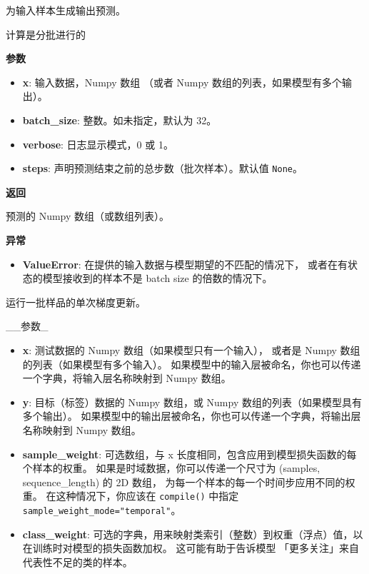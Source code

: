 为输入样本生成输出预测。

计算是分批进行的

\textbf{参数}

\begin{itemize}
\tightlist
\item
  \textbf{x}: 输入数据，Numpy 数组 （或者 Numpy
  数组的列表，如果模型有多个输出）。
\item
  \textbf{batch\_size}: 整数。如未指定，默认为 32。
\item
  \textbf{verbose}: 日志显示模式，0 或 1。
\item
  \textbf{steps}: 声明预测结束之前的总步数（批次样本）。默认值
  \texttt{None}。
\end{itemize}

\textbf{返回}

预测的 Numpy 数组（或数组列表）。

\textbf{异常}

\begin{itemize}
\tightlist
\item
  \textbf{ValueError}: 在提供的输入数据与模型期望的不匹配的情况下，
  或者在有状态的模型接收到的样本不是 batch size 的倍数的情况下。
\end{itemize}



\label{trainux5fonux5fbatch}

\begin{Shaded}
\begin{Highlighting}[]
\OperatorTok{=}\OperatorTok{=}\NormalTok{)}
\end{Highlighting}
\end{Shaded}

运行一批样品的单次梯度更新。

\_\_参数\_

\begin{itemize}
\tightlist
\item
  \textbf{x}: 测试数据的 Numpy 数组（如果模型只有一个输入）， 或者是
  Numpy 数组的列表（如果模型有多个输入）。
  如果模型中的输入层被命名，你也可以传递一个字典，将输入层名称映射到
  Numpy 数组。
\item
  \textbf{y}: 目标（标签）数据的 Numpy 数组，或 Numpy
  数组的列表（如果模型具有多个输出）。
  如果模型中的输出层被命名，你也可以传递一个字典，将输出层名称映射到
  Numpy 数组。
\item
  \textbf{sample\_weight}: 可选数组，与 x
  长度相同，包含应用到模型损失函数的每个样本的权重。
  如果是时域数据，你可以传递一个尺寸为 (samples, sequence\_length) 的 2D
  数组， 为每一个样本的每一个时间步应用不同的权重。
  在这种情况下，你应该在 \texttt{compile()} 中指定
  \texttt{sample\_weight\_mode="temporal"}。
\item
  \textbf{class\_weight}:
  可选的字典，用来映射类索引（整数）到权重（浮点）值，以在训练时对模型的损失函数加权。
  这可能有助于告诉模型 「更多关注」来自代表性不足的类的样本。
\end{itemize}


